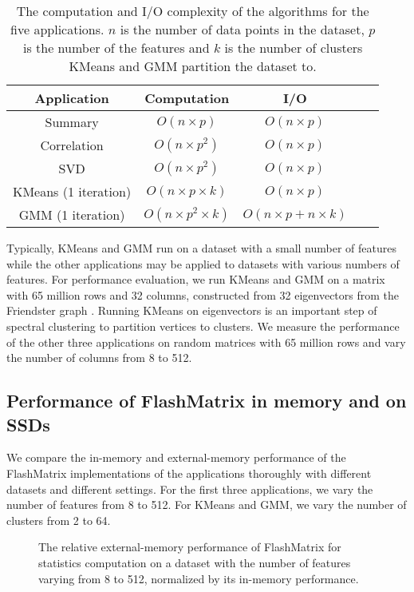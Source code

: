 \begin{table}
\begin{center}
\footnotesize
\begin{tabular}{|c|c|c|c|c|}
\hline
Application & Computation & I/O \\
\hline
Summary & $O(n \times p)$ & $O(n \times p)$ \\
\hline
Correlation & $O(n \times p^2)$ & $O(n \times p)$ \\
\hline
SVD & $O(n \times p^2)$ & $O(n \times p)$ \\
\hline
KMeans (1 iteration) & $O(n \times p \times k)$ & $O(n \times p)$ \\
\hline
GMM (1 iteration) & $O(n \times p^2 \times k)$ & $O(n \times p + n \times k)$ \\
\hline
\end{tabular}
\normalsize
\end{center}
\caption{The computation and I/O complexity of the algorithms for the five
	applications. $n$ is the number of data points in the dataset, $p$ is
	the number of the features and $k$ is the number of clusters KMeans and
GMM partition the dataset to.}
\label{tbl:algs}
\end{table}

Typically, KMeans and GMM run on a dataset with a small number of features
while the other applications may be applied to datasets with various numbers
of features. For performance evaluation, we run KMeans and GMM on a matrix
with 65 million rows and 32 columns, constructed from 32 eigenvectors from
the Friendster graph \cite{friendster}. Running KMeans on eigenvectors is
an important step of spectral clustering \cite{Luxburg07} to partition vertices
to clusters. We measure the performance of the other three applications on
random matrices with 65 million rows and vary the number of columns from 8
to 512.

\subsection{Performance of FlashMatrix in memory and on SSDs}

We compare the in-memory and external-memory performance of the FlashMatrix
implementations of the applications thoroughly with different datasets and
different settings. For the first three applications, we vary the number of
features from 8 to 512. For KMeans and GMM, we vary the number of clusters
from 2 to 64.

\begin{figure}
	\begin{center}
		\footnotesize
		
		\caption{The relative external-memory performance of FlashMatrix for
			statistics computation on a dataset with the number of features
		varying from 8 to 512, normalized by its in-memory performance.}
		\label{perf:stat}
	\end{center}
\end{figure}

